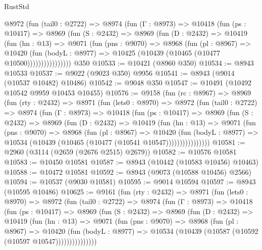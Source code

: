 \begin{lexlean}{RustStd}
\begin{coremodule}
{\begin{coremodule}
{{{{{{{{{{{{{{{{{{{{{{{{{{{{{{{{{{{{{{{          @8972
            (fun (tail0 : @2722) =>
            @8974
              (fun (Γ : @8973) =>
              @10418
                (fun (ps : @10417) =>
                @8969
                  (fun (S : @2432) =>
                  @8969
                    (fun (D : @2432) =>
                    @10419
                      (fun (hn : @13) =>
                      @9071
                        (fun (pns : @9070) =>
                        @8968
                          (fun (pl : @8967) =>
                          @10420
                            (fun (bodyL : @8977) =>
                            @10425 (@10439 (@10465 (@10477 @10500))))))))))))))))
    @350
@10533 := @10421 (@8960 @350)
@10534 := @8943 @10533
@10537 := @9022 (@9023 @350) @9956
@10541 := @8943 (@9014 (@10537 @10482) @10486)
@10542 := @9048 @350
@10547 := @10491 (@10492 @10542 @9959 @10453 @10455)
@10576 := @9158
    (fun (rc : @8967) =>
    @8969
      (fun (rty : @2432) =>
      @8971
        (fun (lets0 : @8970) =>
        @8972
          (fun (tail0 : @2722) =>
          @8974
            (fun (Γ : @8973) =>
            @10418
              (fun (ps : @10417) =>
              @8969
                (fun (S : @2432) =>
                @8969
                  (fun (D : @2432) =>
                  @10419
                    (fun (hn : @13) =>
                    @9071
                      (fun (pns : @9070) =>
                      @8968
                        (fun (pl : @8967) =>
                        @10420
                          (fun (bodyL : @8977) =>
                          @10534 (@10439 (@10465 (@10477 (@10541 @10547))))))))))))))))
@10581 := @2960 (@3114 (@2659 (@2676 @2515) @2679))
@10582 := @10576 @10581
@10583 := @10450 @10581
@10587 := @8943 (@10442 (@10583 @10456) @10463)
@10588 := @10472 @10581
@10592 := @8943 (@9073 (@10588 @10456) @2566)
@10594 := @10537 (@9030 @10581)
@10595 := @9014 @10594
@10597 := @8943 (@10595 @10486)
@10625 := @9161
    (fun (rty : @2432) =>
    @8971
      (fun (lets0 : @8970) =>
      @8972
        (fun (tail0 : @2722) =>
        @8974
          (fun (Γ : @8973) =>
          @10418
            (fun (ps : @10417) =>
            @8969
              (fun (S : @2432) =>
              @8969
                (fun (D : @2432) =>
                @10419
                  (fun (hn : @13) =>
                  @9071
                    (fun (pns : @9070) =>
                    @8968
                      (fun (pl : @8967) =>
                      @10420
                        (fun (bodyL : @8977) =>
                        @10534 (@10439 (@10587 (@10592 (@10597 @10547)))))))))))))))
}}}}}}}}}}}}}}}}}}}}}}}}}}}}}}}}}}}}}}}
\end{coremodule}}
\end{coremodule}
\end{lexlean}
